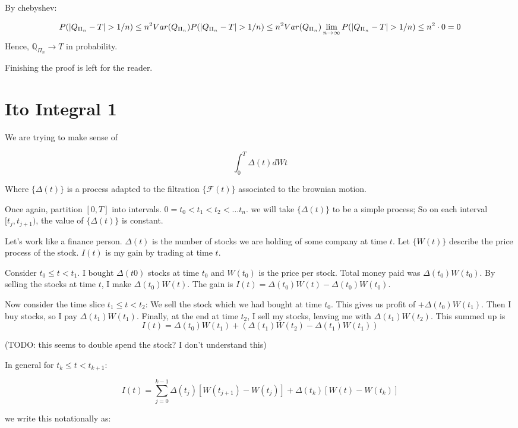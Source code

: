 \documentclass{book}
\newcommand{\F}{\ensuremath{\mathcal{F}}}
\newcommand{\Q}{\ensuremath{\mathbb{Q}}}
\theoremstyle{definition}
\begin{document}
By chebyshev:

$$
P(|Q_{\Pi_n} - T| > 1/n) \leq n^2 Var(Q_{\Pi_n}) \\
P(|Q_{\Pi_n} - T| > 1/n) \leq n^2 Var(Q_{\Pi_n}) \\
\lim _{n \rightarrow \infty} P(|Q_{\Pi_n} - T| > 1/n) \leq n^2 \cdot 0 = 0
$$
Hence, $\Q_{\Pi_n} \rightarrow T$ in probability. 

Finishing the proof is left for the reader.

\chapter{Ito Integral 1}

We are trying to make sense of

$$
\int_0^T \Delta(t) dWt
$$

Where $\{ \Delta(t) \}$ is a process adapted to the filtration $\{ \F(t) \}$
associated to the brownian motion.

Once again, partition $[0, T]$ into intervals. $0 = t_0 < t_1 < t_2 < \dots t_n$.
we will take $\{ \Delta(t) \}$ to be a simple process; So on each interval $[t_j, t_{j+1})$,
the value of $\{ \Delta(t) \}$ is constant. 

Let's work like a finance person. $\Delta(t)$ is the number of stocks we are holding
of some company at time $t$.  Let $\{ W(t) \}$  describe the price process of the stock.
$I(t)$ is my gain by trading at time $t$.

Consider $t_0 \leq t < t_1$. I bought $\Delta(t0)$ stocks at time $t_0$ and
$W(t_0)$ is the price per stock. Total money paid  was $\Delta(t_0) W(t_0)$.
By selling the stocks at time $t$, I make $\Delta(t_0) W(t)$. The gain is 
$I(t) = \Delta(t_0) W(t) -\Delta(t_0) W(t_0)$.


Now consider the time slice $t_1 \leq t < t_2$: We sell the stock which we
had bought at time $t_0$. This gives us profit of $+\Delta(t_0)W(t_1)$. Then
I buy stocks, so I pay $\Delta(t_1)W(t_1)$. Finally, at the end at time $t_2$,
I sell my stocks, leaving me with $\Delta(t_1)W(t_2)$. This summed up is
$$I(t) = \Delta(t_0)W(t_1) + (\Delta(t_1)W(t_2) - \Delta(t_1)W(t_1))$$

(TODO: this seems to double spend the stock? I don't understand this)


In general for $t_k \leq t < t_{k+1}$:

$$
I(t) = \sum_{j=0}^{k-1} \Delta(t_j) [W(t_{j+1}) - W(t_j)] + \Delta(t_k)[W(t) - W(t_k)]
$$

we write this notationally as:
\end{document}
